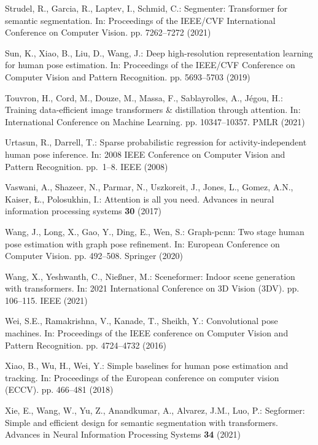\documentclass[runningheads]{llncs}
\begin{document}
\begin{thebibliography}{10}
Strudel, R., Garcia, R., Laptev, I., Schmid, C.: Segmenter: Transformer for
  semantic segmentation. In: Proceedings of the IEEE/CVF International
  Conference on Computer Vision. pp. 7262--7272 (2021)

Sun, K., Xiao, B., Liu, D., Wang, J.: Deep high-resolution representation
  learning for human pose estimation. In: Proceedings of the IEEE/CVF
  Conference on Computer Vision and Pattern Recognition. pp. 5693--5703 (2019)

Touvron, H., Cord, M., Douze, M., Massa, F., Sablayrolles, A., J{\'e}gou, H.:
  Training data-efficient image transformers \& distillation through attention.
  In: International Conference on Machine Learning. pp. 10347--10357. PMLR
  (2021)

Urtasun, R., Darrell, T.: Sparse probabilistic regression for
  activity-independent human pose inference. In: 2008 IEEE Conference on
  Computer Vision and Pattern Recognition. pp.~1--8. IEEE (2008)

Vaswani, A., Shazeer, N., Parmar, N., Uszkoreit, J., Jones, L., Gomez, A.N.,
  Kaiser, {\L}., Polosukhin, I.: Attention is all you need. Advances in neural
  information processing systems  \textbf{30} (2017)

Wang, J., Long, X., Gao, Y., Ding, E., Wen, S.: Graph-pcnn: Two stage human
  pose estimation with graph pose refinement. In: European Conference on
  Computer Vision. pp. 492--508. Springer (2020)

Wang, X., Yeshwanth, C., Nie{\ss}ner, M.: Sceneformer: Indoor scene generation
  with transformers. In: 2021 International Conference on 3D Vision (3DV). pp.
  106--115. IEEE (2021)

Wei, S.E., Ramakrishna, V., Kanade, T., Sheikh, Y.: Convolutional pose
  machines. In: Proceedings of the IEEE conference on Computer Vision and
  Pattern Recognition. pp. 4724--4732 (2016)

Xiao, B., Wu, H., Wei, Y.: Simple baselines for human pose estimation and
  tracking. In: Proceedings of the European conference on computer vision
  (ECCV). pp. 466--481 (2018)

Xie, E., Wang, W., Yu, Z., Anandkumar, A., Alvarez, J.M., Luo, P.: Segformer:
  Simple and efficient design for semantic segmentation with transformers.
  Advances in Neural Information Processing Systems  \textbf{34} (2021)


\end{thebibliography}
\end{document}
